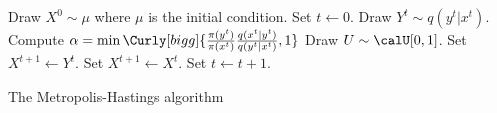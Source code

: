 \begin{algorithm}
\begin{algorithmic}
  \tophrule
  \STATE Draw $X^0\sim\mu$ where $\mu$ is the initial condition.
  \STATE Set $t\leftarrow0$.
  \REPEAT
    \STATE Draw $Y^t\sim q(y^t|x^t)$.
    \STATE Compute $\alpha = \min\Curly[bigg]{
      \frac{\pi(y^t)}{\pi(x^t)}\frac{q(x^t|y^t)}{q(y^t|x^t)}, 1}$
    \STATE Draw $U\sim\calU[0,1]$.
      \STATE Set $X^{t+1}\leftarrow Y^t$.
    \ELSE
      \STATE Set $X^{t+1}\leftarrow X^t$.
    \ENDIF
    \STATE Set $t\leftarrow t+1$.
  \bottomhrule
\end{algorithmic}
\caption{The Metropolis-Hastings algorithm}
\label{alg:mh}
\end{algorithm}
